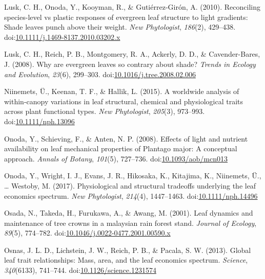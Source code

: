 \documentclass[12pt,]{article}
\theoremstyle{definition}
\theoremstyle{definition}
\theoremstyle{definition}
\theoremstyle{remark}
\begin{document}
\leavevmode\hypertarget{ref-Lusk2010}{}%
Lusk, C. H., Onoda, Y., Kooyman, R., \& Gutiérrez-Girón, A. (2010).
Reconciling species-level vs plastic responses of evergreen leaf
structure to light gradients: Shade leaves punch above their weight.
\emph{New Phytologist}, \emph{186}(2), 429--438.
doi:\href{https://doi.org/10.1111/j.1469-8137.2010.03202.x}{10.1111/j.1469-8137.2010.03202.x}

\leavevmode\hypertarget{ref-Lusk2008}{}%
Lusk, C. H., Reich, P. B., Montgomery, R. A., Ackerly, D. D., \&
Cavender-Bares, J. (2008). Why are evergreen leaves so contrary about
shade? \emph{Trends in Ecology and Evolution}, \emph{23}(6), 299--303.
doi:\href{https://doi.org/10.1016/j.tree.2008.02.006}{10.1016/j.tree.2008.02.006}

\leavevmode\hypertarget{ref-Niinemets2015}{}%
Niinemets, Ü., Keenan, T. F., \& Hallik, L. (2015). A worldwide analysis
of within-canopy variations in leaf structural, chemical and
physiological traits across plant functional types. \emph{New
Phytologist}, \emph{205}(3), 973--993.
doi:\href{https://doi.org/10.1111/nph.13096}{10.1111/nph.13096}

\leavevmode\hypertarget{ref-Onoda2008}{}%
Onoda, Y., Schieving, F., \& Anten, N. P. (2008). Effects of light and
nutrient availability on leaf mechanical properties of Plantago major: A
conceptual approach. \emph{Annals of Botany}, \emph{101}(5), 727--736.
doi:\href{https://doi.org/10.1093/aob/mcn013}{10.1093/aob/mcn013}

\leavevmode\hypertarget{ref-Onoda2017}{}%
Onoda, Y., Wright, I. J., Evans, J. R., Hikosaka, K., Kitajima, K.,
Niinemets, Ü., \ldots{} Westoby, M. (2017). Physiological and structural
tradeoffs underlying the leaf economics spectrum. \emph{New
Phytologist}, \emph{214}(4), 1447--1463.
doi:\href{https://doi.org/10.1111/nph.14496}{10.1111/nph.14496}

\leavevmode\hypertarget{ref-Osada2001}{}%
Osada, N., Takeda, H., Furukawa, A., \& Awang, M. (2001). Leaf dynamics
and maintenance of tree crowns in a malaysian rain forest stand.
\emph{Journal of Ecology}, \emph{89}(5), 774--782.
doi:\href{https://doi.org/10.1046/j.0022-0477.2001.00590.x}{10.1046/j.0022-0477.2001.00590.x}

\leavevmode\hypertarget{ref-Osnas2013}{}%
Osnas, J. L. D., Lichstein, J. W., Reich, P. B., \& Pacala, S. W.
(2013). Global leaf trait relationships: Mass, area, and the leaf
economics spectrum. \emph{Science}, \emph{340}(6133), 741--744.
doi:\href{https://doi.org/10.1126/science.1231574}{10.1126/science.1231574}
\end{document}
